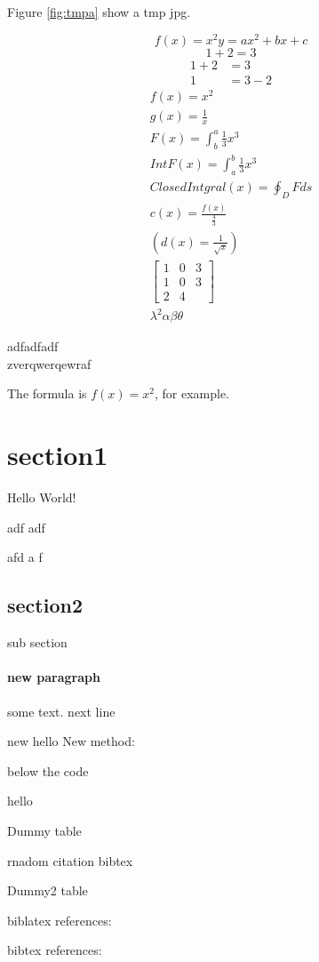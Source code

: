 \documentclass{article}
\begin{document}
Figure \ref{fig:tmpa} show a tmp jpg.

\begin{equation*}
	f(x)=x^2
	y=ax^2+bx+c
\end{equation*}
\begin{equation*}
	1+2 =3
\end{equation*}
\begin{align}
	1+2&=3\\
	1&=3-2
\end{align}
\begin{align}
	f(x)=x^2\\
	g(x)=\frac{1}{x}\\
	F(x)=\int^a_b    \frac{1}{3}x^3\\
	IntF(x)=\int_a^b    \frac{1}{3}x^3\\
	ClosedIntgral(x)=\oint_D F ds\\
	c(x)=\frac{f(x)}{\frac{4}{3}}\\
	\left(d(x)=\frac{1}{\sqrt{x}}\right)\\
	\left[
		\begin{matrix}
			1&0&3\\
			1&0&3\\
			2&4
		\end{matrix}
	\right]\\
	\lambda^2
	\alpha
	\beta
	\theta
\end{align}

adfadfadf\\zverqwerqewraf

The formula is $f(x)=x^2$, for example.
\newpage


\newpage
\section{section1}
Hello World!


adf
adf

afd
a
f
\subsection{section2}
sub section
\paragraph{new paragraph}
some text.
next line

\newpage
new hello
New method:
\begin{listing}[h!]
	\caption{below the code}
	\label{lst:main}
\end{listing}
\newpage
hello
\begin{table}
	\caption{Dummy table}
\end{table}
rnadom citation \cite{dummybook:1} bibtex

\begin{table}
	\caption{Dummy2 table}
\end{table}
\newpage
\begin{appendix}
	\listoffigures
	\listoftables
	\listoflistings
\end{appendix}

\newpage
biblatex references:

bibtex references:


\end{document}
